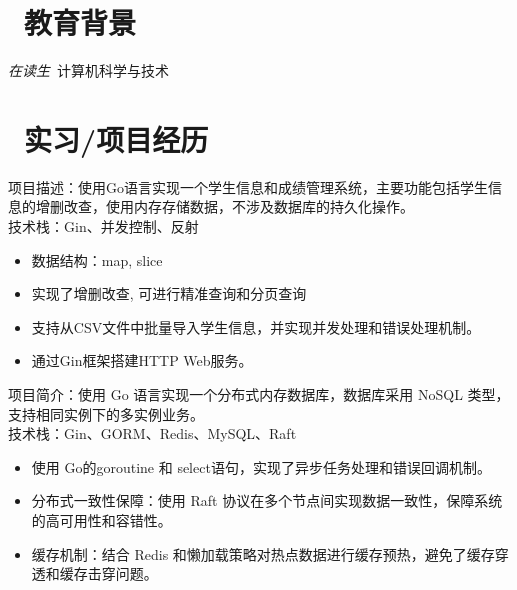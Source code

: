 \documentclass{resume}
\begin{document}


 
\section{\faGraduationCap\  教育背景}
\textit{在读生}\ 计算机科学与技术

\section{\faUsers\ 实习/项目经历}
\role{Golang}{个人项目}
项目描述：使用Go语言实现一个学生信息和成绩管理系统，主要功能包括学生信息的增删改查，使用内存存储数据，不涉及数据库的持久化操作。\\
技术栈：Gin、并发控制、反射
\begin{itemize}
  \item 数据结构：map, slice
  \item 实现了增删改查, 可进行精准查询和分页查询
  \item 支持从CSV文件中批量导入学生信息，并实现并发处理和错误处理机制。
  \item 通过Gin框架搭建HTTP Web服务。
\end{itemize}

\begin{onehalfspacing}
项目简介：使用 Go 语言实现一个分布式内存数据库，数据库采用 NoSQL 类型，支持相同实例下的多实例业务。\\
技术栈：Gin、GORM、Redis、MySQL、Raft
\begin{itemize}
 \item 使用 Go的goroutine 和 select语句，实现了异步任务处理和错误回调机制。
  \item 分布式一致性保障：使用 Raft 协议在多个节点间实现数据一致性，保障系统的高可用性和容错性。
  \item 缓存机制：结合 Redis 和懒加载策略对热点数据进行缓存预热，避免了缓存穿透和缓存击穿问题。
\end{itemize}
\end{onehalfspacing}
\end{document}
